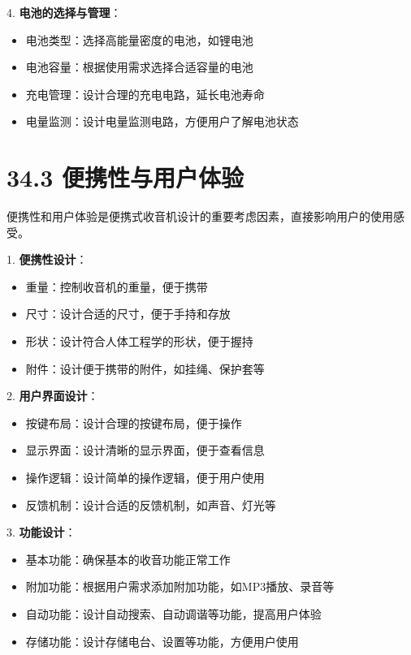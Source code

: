 \documentclass[12pt,UTF8]{ctexbook}
\begin{document}
4. \textbf{电池的选择与管理}：
   \begin{itemize}[leftmargin=3.5em]
   \item 电池类型：选择高能量密度的电池，如锂电池
   \item 电池容量：根据使用需求选择合适容量的电池
   \item 充电管理：设计合理的充电电路，延长电池寿命
   \item 电量监测：设计电量监测电路，方便用户了解电池状态
   \end{itemize}

\section*{34.3 便携性与用户体验}

便携性和用户体验是便携式收音机设计的重要考虑因素，直接影响用户的使用感受。

1. \textbf{便携性设计}：
   \begin{itemize}[leftmargin=3.5em]
   \item 重量：控制收音机的重量，便于携带
   \item 尺寸：设计合适的尺寸，便于手持和存放
   \item 形状：设计符合人体工程学的形状，便于握持
   \item 附件：设计便于携带的附件，如挂绳、保护套等
   \end{itemize}

2. \textbf{用户界面设计}：
   \begin{itemize}[leftmargin=3.5em]
   \item 按键布局：设计合理的按键布局，便于操作
   \item 显示界面：设计清晰的显示界面，便于查看信息
   \item 操作逻辑：设计简单的操作逻辑，便于用户使用
   \item 反馈机制：设计合适的反馈机制，如声音、灯光等
   \end{itemize}

3. \textbf{功能设计}：
   \begin{itemize}[leftmargin=3.5em]
   \item 基本功能：确保基本的收音功能正常工作
   \item 附加功能：根据用户需求添加附加功能，如MP3播放、录音等
   \item 自动功能：设计自动搜索、自动调谐等功能，提高用户体验
   \item 存储功能：设计存储电台、设置等功能，方便用户使用
   \end{itemize}
\end{document}
